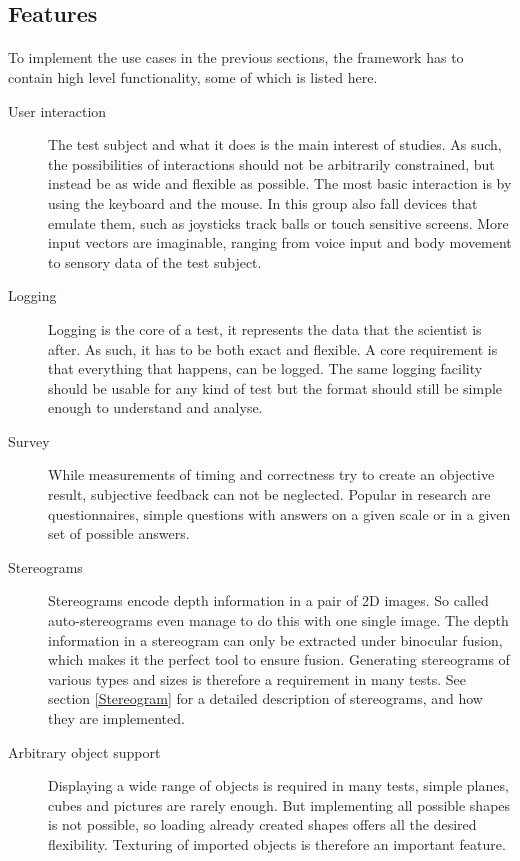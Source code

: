 \subsection{Features}
\paragraph{}
To implement the use cases in the previous sections, the framework has to contain high level functionality, some of which is listed here.

\begin{description}
\item[User interaction]
The test subject and what it does is the main interest of studies.
As such, the possibilities of interactions should not be arbitrarily constrained, but instead be as wide and flexible as possible.
The most basic interaction is by using the keyboard and the mouse.
In this group also fall devices that emulate them, such as joysticks track balls or touch sensitive screens.
More input vectors are imaginable, ranging from voice input and body movement to sensory data of the test subject.

\item[Logging]
Logging is the core of a test, it represents the data that the scientist is after.
As such, it has to be both exact and flexible.
A core requirement is that everything that happens, can be logged.
The same logging facility should be usable for any kind of test but the format should still be simple enough to understand and analyse.

\item[Survey]
While measurements of timing and correctness try to create an objective result, subjective feedback can not be neglected.
Popular in research are questionnaires, simple questions with answers on a given scale or in a given set of possible answers.

\item[Stereograms]
Stereograms encode depth information in a pair of 2D images.
So called auto-stereograms even manage to do this with one single image.
The depth information in a stereogram can only be extracted under binocular fusion, which makes it the perfect tool to ensure fusion.
Generating stereograms of various types and sizes is therefore a requirement in many tests.
See section \ref{Stereogram} for a detailed description of stereograms, and how they are implemented.

\item[Arbitrary object support]
Displaying a wide range of objects is required in many tests, simple planes, cubes and pictures are rarely enough.
But implementing all possible shapes is not possible, so loading already created shapes offers all the desired flexibility.
Texturing of imported objects is therefore an important feature.


\end{description}
